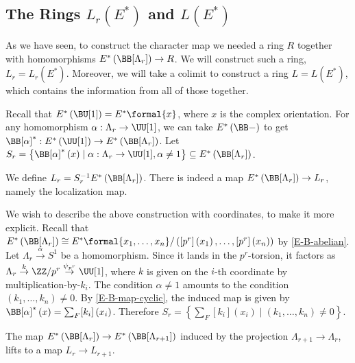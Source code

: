 \subsection{The Rings \texorpdfstring{$L_r\left(E^*\right)$}{Lr(E*)} and \texorpdfstring{$L\left(E^*\right)$}{L(E*)}}

As we have seen, to construct the character map we needed a ring $R$ together with homomorphisms $E^*\left(\BB[\Lambda_r]\right) \to R$.
We will construct such a ring, $L_r = L_r\left(E^*\right)$.
Moreover, we will take a colimit to construct a ring $L = L\left(E^*\right)$, which contains the information from all of those together.

Recall that $E^*\left(\BU[1]\right) = E^*\formal{x}$, where $x$ is the complex orientation.
For any homomorphism $\alpha: \Lambda_r \to \UU[1]$, we can take $E^*\left(\BB-\right)$ to get $\BB[\alpha]^*: E^*\left(\UU[1]\right) \to E^*\left(\BB[\Lambda_r]\right)$.
Let $S_r = \left\{ \BB[\alpha]^*\left(x\right) \mid \alpha: \Lambda_r \to \UU[1], \alpha \neq 1 \right\} \subseteq E^*\left(\BB[\Lambda_r]\right)$.

\begin{definition}
	We define $L_r = S_r^{-1} E^*\left(\BB[\Lambda_r]\right)$.
	There is indeed a map $E^*\left(\BB[\Lambda_r]\right) \to L_r$, namely the localization map.
\end{definition}

We wish to describe the above construction with coordinates, to make it more explicit.
Recall that $E^*\left(\BB[\Lambda_r]\right) \cong E^*\formal{x_1, \dotsc, x_n}/\left(\left[p^r\right]\left(x_1\right), \dotsc, \left[p^r\right]\left(x_n\right)\right)$ by \ref{E-B-abelian}.
Let $\Lambda_r \overset{\alpha}{\to} S^1$ be a homomorphism.
Since it lands in the $p^r$-torsion, it factors as $\Lambda_r \overset{k}{\to} \ZZ/{p^r} \overset{\psi_{p^r}}{\to} \UU[1]$, where $k$ is given on the $i$-th coordinate by multiplication-by-$k_i$.
The condition $\alpha \neq 1$ amounts to the condition $\left(k_1, \dotsc, k_n\right) \neq 0$.
By \ref{E-B-map-cyclic}, the induced map is given by $\BB[\alpha]^*\left(x\right) = \sum_F [k_i]\left(x_i\right)$.
Therefore $S_r = \left\{ \sum_F [k_i]\left(x_i\right) \mid \left(k_1, \dotsc, k_n\right) \neq 0\right\}$.

\begin{proposition}
	The map $E^*\left(\BB[\Lambda_r]\right) \to E^*\left(\BB[\Lambda_{r+1}]\right)$ induced by the projection $\Lambda_{r+1} \to \Lambda_r$, lifts to a map $L_r \to L_{r+1}$.
\end{proposition}

